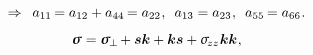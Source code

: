 \nopagebreak\vspace{-1em}
\begin{equation*}
\Rightarrow \hspace{.5em}
a_{11} \hspace{-.2ex} = a_{12} + a_{44} \hspace{-.2ex} = a_{22}
\hspace{.1ex} ,
\hspace{.5em}
a_{13} = a_{23}
\hspace{.1ex} ,
\hspace{.5em}
a_{55} \hspace{-.2ex} = a_{66}
\hspace{.1ex} .
\end{equation*}


\nopagebreak
\begin{equation}\label{stress tensor for a transversely isotropic material}
\linearstress
= \withtheindexofperpendicularity{\linearstress} \hspace{-0.2ex}
+ \bm{s} \bm{k}
+ \bm{k} \bm{s}
+ \linearstresscomponents{zz} \hspace{.1ex} \bm{k} \bm{k}
\hspace{.1ex} ,
\end{equation}

\vspace{-0.8em}\noindent
{}

